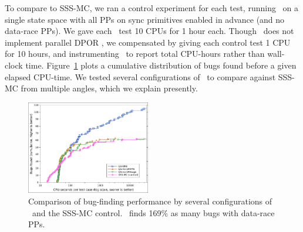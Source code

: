 
To compare to SSS-MC, we ran a control experiment for each test, running \landslide~on a single state space with all PPs on sync primitives enabled in advance (and no data-race PPs).
We gave each \quicksand~test 10 CPUs for 1 hour each. %
Though \landslide~does not implement parallel DPOR \cite{parallel-dpor}, we compensated by giving each control test 1 CPU for 10 hours,
and instrumenting \quicksand~to report total CPU-hours rather than wall-clock time.
Figure~\ref{fig:dowefindbugsfaster} plots a cumulative distribution of bugs found before a given elapsed CPU-time. %
We tested several configurations of \quicksand~to compare against SSS-MC from multiple angles,
which we explain presently.

\begin{figure}[t]
	\includegraphics[width=0.48\textwidth]{dowefindbugsfaster.pdf}
	\caption{Comparison of bug-finding performance
	by several configurations of \quicksand~and the SSS-MC control.
	\quicksand~finds 169\% as many bugs with data-race PPs.}
	\label{fig:dowefindbugsfaster}
\end{figure}

